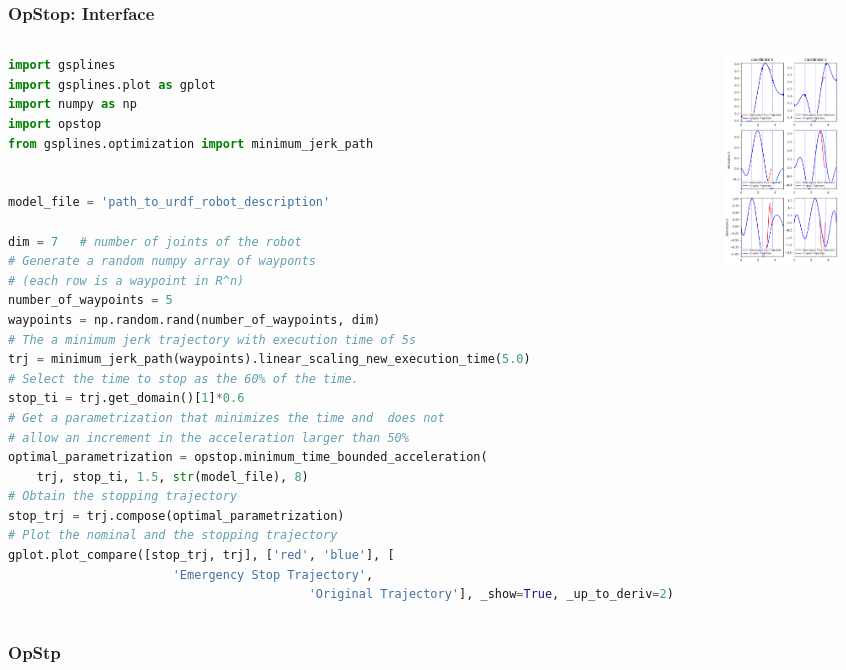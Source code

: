 \begin{frame}[fragile]
	\frametitle{OpStop: Interface}
	\begin{columns}
		\begin{column}{0.4\textwidth}
			\begin{lstlisting}[language=python]
import gsplines
import gsplines.plot as gplot
import numpy as np
import opstop
from gsplines.optimization import minimum_jerk_path


model_file = 'path_to_urdf_robot_description'

dim = 7   # number of joints of the robot
# Generate a random numpy array of wayponts
# (each row is a waypoint in R^n)
number_of_waypoints = 5
waypoints = np.random.rand(number_of_waypoints, dim)
# The a minimum jerk trajectory with execution time of 5s
trj = minimum_jerk_path(waypoints).linear_scaling_new_execution_time(5.0)
# Select the time to stop as the 60% of the time.
stop_ti = trj.get_domain()[1]*0.6
# Get a parametrization that minimizes the time and  does not
# allow an increment in the acceleration larger than 50%
optimal_parametrization = opstop.minimum_time_bounded_acceleration(
    trj, stop_ti, 1.5, str(model_file), 8)
# Obtain the stopping trajectory
stop_trj = trj.compose(optimal_parametrization)
# Plot the nominal and the stopping trajectory
gplot.plot_compare([stop_trj, trj], ['red', 'blue'], [
                       'Emergency Stop Trajectory',
                                          'Original Trajectory'], _show=True, _up_to_deriv=2)
    \end{lstlisting}
		\end{column}
		\begin{column}{0.6\textwidth}
			\includegraphics[width=3cm]{./images/temporal_opstopimage.png}
		\end{column}
	\end{columns}
\end{frame}
\begin{frame}
	\frametitle{OpStp}
\end{frame}
